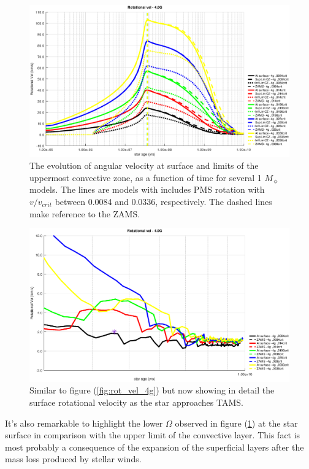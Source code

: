 \documentclass[fleqn,usenatbib]{mnras}
\begin{document}
\begin{figure}
	\includegraphics[width=\columnwidth]{figures/rot_vel_cz_4g.eps}
    \caption{The evolution of angular velocity at surface and limits of the uppermost convective zone, as a function of time for several 1 $M_{\sun}$ models. The lines are models with includes PMS rotation with $v/v_{crit}$ between 0.0084 and 0.0336, respectively. The dashed lines make reference to the ZAMS.}
    \label{fig:rot_vel_cz_4g}
\end{figure}

\begin{figure}
	\includegraphics[width=\columnwidth]{figures/rot_vel_4g_z1.eps}
    \caption{Similar to figure (\ref{fig:rot_vel_4g}) but now showing in detail the surface rotational velocity as the star approaches TAMS.}
    \label{fig:rot_vel_4g_z1}
\end{figure}

It's also remarkable to highlight the lower $\Omega$ observed in figure (\ref{fig:rot_vel_cz_4g}) at the star surface in comparison with the upper limit of the convective layer. This fact is most probably a consequence of the expansion of the superficial layers after the mass loss produced by stellar winds.\par
\end{document}
